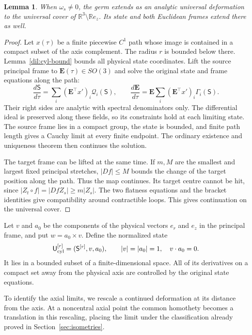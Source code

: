 \documentclass[11pt,a4paper]{article}
\numberwithin{equation}{section}
\theoremstyle{plain}
\newtheorem{lemma}[theorem]{Lemma}
\theoremstyle{definition}
\theoremstyle{remark}
\begin{document}
\begin{lemma}\label{dil:continuation}
When $\omega_s\ne0$, the germ extends as an analytic universal
deformation to the universal cover of
$\mathbb R^3\setminus\mathbb Re_z$. Its state and both Euclidean
frames extend there as well.
\end{lemma}
\begin{proof}
Let $x(\tau)$ be a finite piecewise $C^1$ path whose image is contained
in a compact subset of the axis complement.  The radius $r$ is bounded
below there.  Lemma~\ref{dil:cyl-bound} bounds all physical
state coordinates.  Lift the source principal frame to $\mathbf E(\tau)\in
SO(3)$ and solve the original state and frame equations along the path:
\begin{equation}\label{dil:continuation-ode}
 \frac{d\mathsf S}{d\tau}=\sum_i(\mathbf E^{\top}x')_i\mathcal Q_i(\mathsf S),\qquad
 \frac{d\mathbf E}{d\tau}=\mathbf E\sum_i(\mathbf E^{\top}x')_i\Gamma_i(\mathsf S).
\end{equation}
Their right sides are analytic with spectral denominators only.
The differential ideal is preserved along these fields, so its constraints hold at each limiting state.  The source frame lies in a compact group, the
state is bounded, and finite path length gives a Cauchy limit at every
finite endpoint.  The ordinary existence and uniqueness theorem then
continues the solution.

The target frame can be lifted at the same time.  If $m,M$ are the
smallest and largest fixed principal stretches, $|Df|\le M$ bounds
the change of the target position along the path.  Thus the map continues.  Its target centre cannot be hit, since
$|Z_t\circ f|=|DfZ_s|\ge m|Z_s|$.  The two flatness equations and the
bracket identities give compatibility around contractible
loops.  This gives continuation on the universal cover.
\end{proof}

Let $v$ and $a_0$ be the components of the physical vectors $e_r$ and
$e_z$ in the principal frame, and put $w=a_0\times v$.    Define the normalized
state
\begin{equation}\label{dil:normalized-state}
 \mathsf U_{\rm cyl}^{[r]}=(\mathsf S^{[r]},v,a_0),\qquad
 |v|=|a_0|=1,\quad v\cdot a_0=0.
\end{equation}
It lies in a bounded subset of a finite-dimensional space.  All of its
derivatives on a compact set away from the physical axis are controlled
by the original state equations.

To identify the axial limits, we rescale a continued deformation
at its distance from the axis.  At a noncentral axial point the common
homothety becomes a translation in this rescaling, placing the limit
under the classification already proved in Section~\ref{sec:isometries}.
\end{document}
